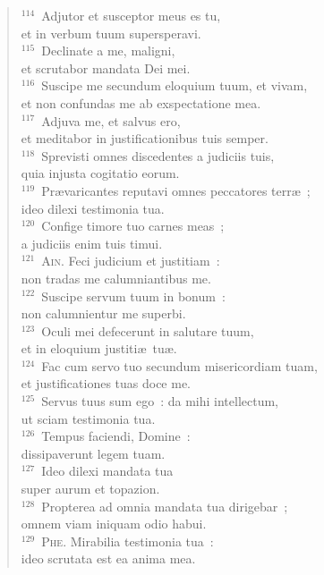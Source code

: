\begin{verse}
${}^{114}$~Adjutor et susceptor meus es tu,\\ et in verbum tuum supersperavi.\\
${}^{115}$~Declinate a me, maligni,\\ et scrutabor mandata Dei mei.\\
${}^{116}$~Suscipe me secundum eloquium tuum, et vivam,\\ et non confundas me ab exspectatione mea.\\
${}^{117}$~Adjuva me, et salvus ero,\\ et meditabor in justificationibus tuis semper.\\
${}^{118}$~Sprevisti omnes discedentes a judiciis tuis,\\ quia injusta cogitatio eorum.\\
${}^{119}$~Pr\ae varicantes reputavi omnes peccatores terr\ae~;\\ ideo dilexi testimonia tua.\\
${}^{120}$~Confige timore tuo carnes meas~;\\ a judiciis enim tuis timui.\\
${}^{121}$~\textsc{Ain.} Feci judicium et justitiam~:\\ non tradas me calumniantibus me.\\
${}^{122}$~Suscipe servum tuum in bonum~:\\ non calumnientur me superbi.\\
${}^{123}$~Oculi mei defecerunt in salutare tuum,\\ et in eloquium justiti\ae\ tu\ae .\\
${}^{124}$~Fac cum servo tuo secundum misericordiam tuam,\\ et justificationes tuas doce me.\\
${}^{125}$~Servus tuus sum ego~: da mihi intellectum,\\ ut sciam testimonia tua.\\
${}^{126}$~Tempus faciendi, Domine~:\\ dissipaverunt legem tuam.\\
${}^{127}$~Ideo dilexi mandata tua\\ super aurum et topazion.\\
${}^{128}$~Propterea ad omnia mandata tua dirigebar~;\\ omnem viam iniquam odio habui.\\
${}^{129}$~\textsc{Phe.} Mirabilia testimonia tua~:\\ ideo scrutata est ea anima mea.\\

\end{verse}

